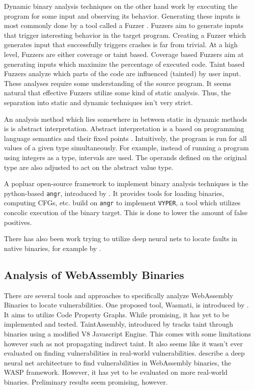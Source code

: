 \documentclass[sigconf]{acmart}
\begin{document}
Dynamic binary analysis techniques on the other hand work by executing the program for some input and observing its behavior. Generating these inputs is most commonly done by a tool called a Fuzzer \cite{li_fuzzing_2018}. Fuzzers aim to generate inputs that trigger interesting behavior in the target program. Creating a Fuzzer which generates input that successfully triggers crashes is far from trivial. At a high level, Fuzzers are either coverage or taint based. Coverage based Fuzzers aim at generating inputs which maximize the percentage of executed code. Taint based Fuzzers analyze which parts of the code are influenced (tainted) by user input. These analyses require some understanding of the source program. It seems natural that effective Fuzzers utilize some kind of static analysis. Thus, the separation into static and dynamic techniques isn't very strict.

An analysis method which lies somewhere in between static in dynamic methods is is abstract interpretation. Abstract interpretation is a based on programming language semantics and their fixed points \cite{cousot_abstract_2000}. Intuitively, the program is run for all values of a given type simultaneously. For example, instead of running a program using integers as a type, intervals are used. The operands defined on the original type are also adjusted to act on the abstract value type. 

A popluar open-source framework to implement binary analysis techniques is the python-based \texttt{angr}, introduced by \citet{shoshitaishvili_sok_2016}. It provides tools for loading binaries, computing CFGs, etc. \citet{boudjema_vyper_2020} build on \texttt{angr} to implement \texttt{VYPER}, a tool which utilizes concolic execution of the binary target. This is done to lower the amount of false positives. 

There has also been work trying to utilize deep neural nets to locate faults in native binaries, for example by \citet{li_locating_2019}.

\subsection{Analysis of WebAssembly Binaries}
\label{sec:wasm_analysis}
There are several tools and approaches to specifically analyze WebAssembly Binaries to locate vulnerabilities. One proposed tool, Wasmati, is introduced by \citet{lopes_discovering_2021}. It aims to utilize Code Property Graphs. While promising, it has yet to be implemented and tested. TaintAssembly, introduced by \citet{fu_taintassembly_2018} tracks taint through binaries using a modified V8 Javascript Engine. This comes with some limitations however such as not propagating indirect taint. It also seems like it wasn't ever evaluated on finding vulnerabilities in real-world vulnerabilities. \citet{sun_poster_2021} describe a deep neural net architecture to find vulnerabilities in WebAssembly binaries, the WASP framework. However, it has yet to be evaluated on more real-world binaries. Preliminary results seem promising, however. 
\end{document}
